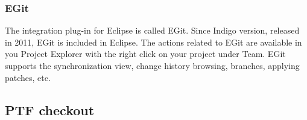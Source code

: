 \documentclass[11pt,a4paper, oneside]{book} %
\newcommand{\ptpurl}{\url{http://download.eclipse.org/tools/ptp/updates/mars} }
\begin{document}

\subsubsection{EGit}

The integration plug-in for Eclipse is called EGit. Since Indigo version,
released in 2011, EGit is included in Eclipse. The actions related to EGit are
available in you Project Explorer with the right click on your project under
Team. EGit supports the synchronization view, change history browsing, branches,
applying patches, etc.

\subsection{PTF checkout}
\end{document}
